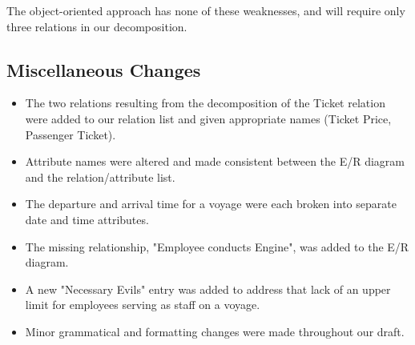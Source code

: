 \documentclass[a4paper]{article}
\begin{document}
The object-oriented approach has none of these weaknesses, and will require only three relations in our decomposition.\\
	
\subsection*{Miscellaneous Changes}
\begin{itemize}
\item The two relations resulting from the decomposition of the Ticket relation were added to our relation list and given appropriate names (Ticket Price, Passenger Ticket).
    
\item Attribute names were altered and made consistent between the E/R diagram and the relation/attribute list.

\item The departure and arrival time for a voyage were each broken into separate date and time attributes.

\item The missing relationship, "Employee conducts Engine", was added to the E/R diagram.

\item A new "Necessary Evils" entry was added to address that lack of an upper limit for employees serving as staff on a voyage.

\item Minor grammatical and formatting changes were made throughout our draft.
\end{itemize}
\end{document}
